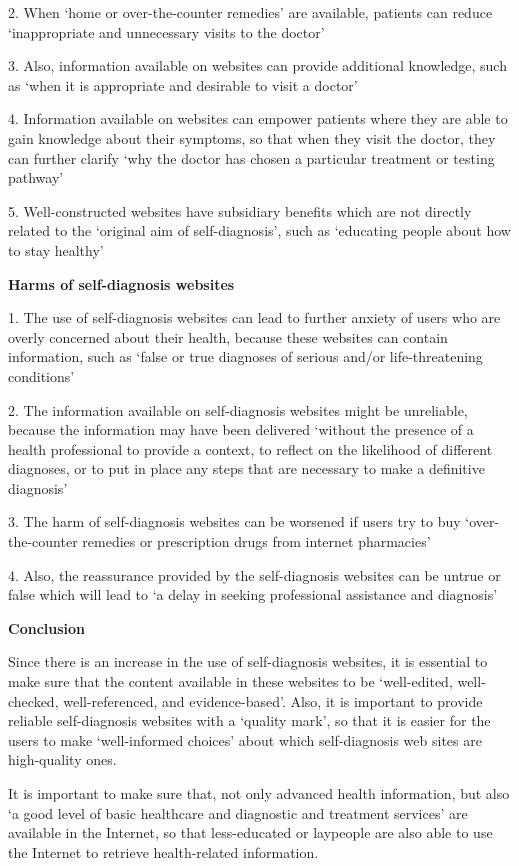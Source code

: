 \documentclass[]{article}
\begin{document}
2.	When ‘home or over-the-counter remedies’ are available, patients can reduce ‘inappropriate and unnecessary visits to the doctor’

3.	Also, information available on websites can provide additional knowledge, such as ‘when it is appropriate and desirable to visit a doctor’

4.	Information available on websites can empower patients where they are able to gain knowledge about their symptoms, so that when they visit the doctor, they can further clarify ‘why the doctor has chosen a particular treatment or testing pathway’

5.	Well-constructed websites have subsidiary benefits which are not directly related to the ‘original aim of self-diagnosis’, such as ‘educating people about how to stay healthy’ 

\textbf{Harms of self-diagnosis websites}

1.	The use of self-diagnosis websites can lead to further anxiety of users who are overly concerned about their health, because these websites can contain information, such as ‘false or true diagnoses of serious and/or life-threatening conditions’

2.	The information available on self-diagnosis websites might be unreliable, because the information may have been delivered ‘without the presence of a health professional to provide a context, to reflect on the likelihood of different diagnoses, or to put in place any steps that are necessary to make a definitive diagnosis’

3.	The harm of self-diagnosis websites can be worsened if users try to buy ‘over-the-counter remedies or prescription drugs from internet pharmacies’

4.	Also, the reassurance provided by the self-diagnosis websites can be untrue or false which will lead to ‘a delay in seeking professional assistance and diagnosis’
    
\textbf{Conclusion}

Since there is an increase in the use of self-diagnosis websites, it is essential to make sure that the content available in these websites to be ‘well-edited, well-checked, well-referenced, and evidence-based’. Also, it is important to provide reliable self-diagnosis websites with a ‘quality mark’, so that it is easier for the users to make ‘well-informed choices’ about which self-diagnosis web sites are high-quality ones.

It is important to make sure that, not only advanced health information, but also ‘a good level of basic healthcare and diagnostic and treatment services’ are available in the Internet, so that less-educated or laypeople are also able to use the Internet to retrieve health-related information. 
\end{document}
